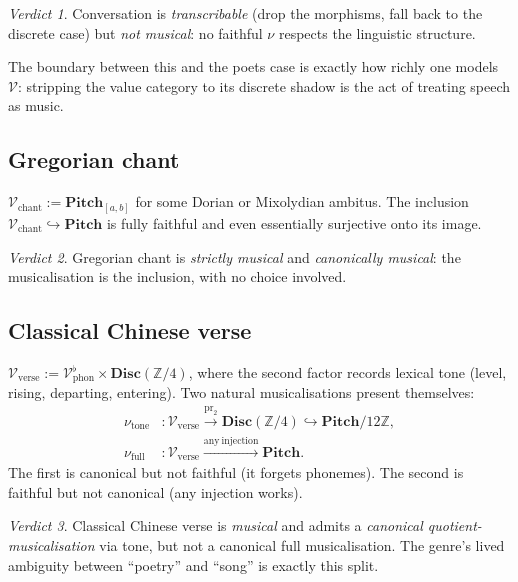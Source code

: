\documentclass[11pt]{article}
\theoremstyle{definition}
\theoremstyle{plain}
\theoremstyle{remark}
\newtheorem*{verdict}{Verdict}
\newcommand{\V}{\mathcal{V}}
\newcommand{\Pitch}{\mathbf{Pitch}}
\newcommand{\Disc}{\mathbf{Disc}}
\newcommand{\Z}{\mathbb{Z}}
\begin{document}
\begin{verdict}
Conversation is \emph{transcribable} (drop the morphisms, fall back
to the discrete case) but \emph{not musical}: no faithful $\nu$
respects the linguistic structure.
\end{verdict}

\noindent The boundary between this and the poets case is exactly
how richly one models $\V$: stripping the value category to its
discrete shadow is the act of treating speech as music.

\subsection{Gregorian chant}
$\V_{\mathrm{chant}} := \Pitch_{[a,b]}$ for some Dorian or
Mixolydian ambitus. The inclusion
$\V_{\mathrm{chant}} \hookrightarrow \Pitch$ is fully faithful and
even essentially surjective onto its image.

\begin{verdict}
Gregorian chant is \emph{strictly musical} and \emph{canonically
musical}: the musicalisation is the inclusion, with no choice
involved.
\end{verdict}

\subsection{Classical Chinese verse}
$\V_{\mathrm{verse}} := \V_{\mathrm{phon}}^\flat \times \Disc(\Z/4)$,
where the second factor records lexical tone (level, rising,
departing, entering). Two natural musicalisations present themselves:
\begin{align*}
\nu_{\mathrm{tone}} &: \V_{\mathrm{verse}}
   \xrightarrow{\mathrm{pr}_2} \Disc(\Z/4)
   \hookrightarrow \Pitch / 12\Z, \\
\nu_{\mathrm{full}} &: \V_{\mathrm{verse}}
   \xrightarrow{\mathrm{any\ injection}} \Pitch.
\end{align*}
The first is canonical but not faithful (it forgets phonemes). The
second is faithful but not canonical (any injection works).

\begin{verdict}
Classical Chinese verse is \emph{musical} and admits a
\emph{canonical quotient-musicalisation} via tone, but not a
canonical full musicalisation. The genre's lived ambiguity between
``poetry'' and ``song'' is exactly this split.
\end{verdict}
\end{document}
